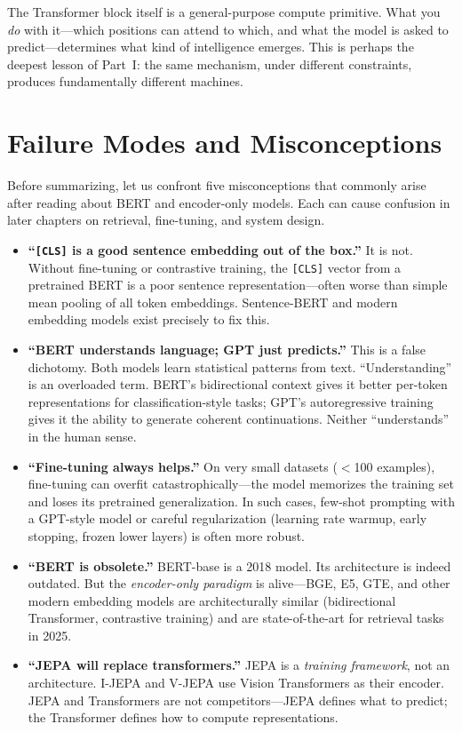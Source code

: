 The Transformer block itself is a general-purpose compute primitive. What you \emph{do} with it---which positions can attend to which, and what the model is asked to predict---determines what kind of intelligence emerges. This is perhaps the deepest lesson of Part~I: the same mechanism, under different constraints, produces fundamentally different machines.


\section{Failure Modes and Misconceptions}
\label{sec:bert-failures}

Before summarizing, let us confront five misconceptions that commonly arise after reading about BERT and encoder-only models. Each can cause confusion in later chapters on retrieval, fine-tuning, and system design.

\begin{itemize}
  \item \textbf{``\texttt{[CLS]} is a good sentence embedding out of the box.''} It is not. Without fine-tuning or contrastive training, the \texttt{[CLS]} vector from a pretrained BERT is a poor sentence representation---often worse than simple mean pooling of all token embeddings. Sentence-BERT and modern embedding models exist precisely to fix this.

  \item \textbf{``BERT understands language; GPT just predicts.''} This is a false dichotomy. Both models learn statistical patterns from text. ``Understanding'' is an overloaded term. BERT's bidirectional context gives it better per-token representations for classification-style tasks; GPT's autoregressive training gives it the ability to generate coherent continuations. Neither ``understands'' in the human sense.

  \item \textbf{``Fine-tuning always helps.''} On very small datasets ($<$100 examples), fine-tuning can overfit catastrophically---the model memorizes the training set and loses its pretrained generalization. In such cases, few-shot prompting with a GPT-style model or careful regularization (learning rate warmup, early stopping, frozen lower layers) is often more robust.

  \item \textbf{``BERT is obsolete.''} BERT-base is a 2018 model. Its architecture is indeed outdated. But the \emph{encoder-only paradigm} is alive---BGE, E5, GTE, and other modern embedding models are architecturally similar (bidirectional Transformer, contrastive training) and are state-of-the-art for retrieval tasks in 2025.

  \item \textbf{``JEPA will replace transformers.''} JEPA is a \emph{training framework}, not an architecture. I-JEPA and V-JEPA use Vision Transformers as their encoder. JEPA and Transformers are not competitors---JEPA defines what to predict; the Transformer defines how to compute representations.
\end{itemize}


